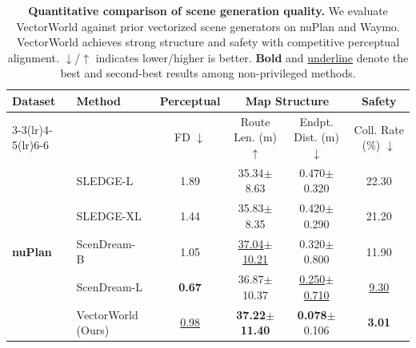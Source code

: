 \documentclass{article}
\newcommand{\best}[1]{\textbf{#1}}
\newcommand{\secbest}[1]{\underline{#1}}
\theoremstyle{plain}
\theoremstyle{definition}
\theoremstyle{remark}
\begin{document}
\begin{table}[t]
\centering
\begin{threeparttable}
\caption{\textbf{Quantitative comparison of scene generation quality.}
We evaluate VectorWorld against prior vectorized scene generators on nuPlan and Waymo. VectorWorld achieves strong structure and safety with competitive perceptual alignment.
\(\downarrow\)/\(\uparrow\) indicates lower/higher is better.
\textbf{Bold} and \underline{underline} denote the best and second-best results among non-privileged methods.}
\label{tab:main_performance}
\renewcommand{\arraystretch}{0.9} %
\setlength{\tabcolsep}{1pt} %
\begin{tabular}{@{}llcccc@{}}
\toprule
\multirow{2.5}{*}{\textbf{Dataset}} & \multirow{2.5}{*}{\textbf{Method}} & \textbf{Perceptual} & \multicolumn{2}{c}{\textbf{Map Structure}} & \textbf{Safety} \\
\cmidrule(lr){3-3}\cmidrule(lr){4-5}\cmidrule(lr){6-6}
 & & FD $\downarrow$ & Route Len. (m) $\uparrow$ & Endpt. Dist. (m) $\downarrow$ & Coll. Rate (\%) $\downarrow$ \\
\midrule

\multirow{5}{*}{\textbf{nuPlan}} 
& SLEDGE-L~\cite{chitta2024sledge} & 1.89 & 35.34{\scriptsize $\pm$8.63} & 0.470{\scriptsize $\pm$0.320} & 22.30 \\
& SLEDGE-XL~\cite{chitta2024sledge} & 1.44 & 35.83{\scriptsize $\pm$8.35} & 0.420{\scriptsize $\pm$0.290} & 21.20 \\
& ScenDream-B~\cite{rowe2025scenario} & 1.05 & \secbest{37.04{\scriptsize $\pm$10.21}} & 0.320{\scriptsize $\pm$0.800} & 11.90 \\
& ScenDream-L~\cite{rowe2025scenario} & \best{0.67} & 36.87{\scriptsize $\pm$10.37} & \secbest{0.250{\scriptsize $\pm$0.710}} & \secbest{9.30} \\
& \cellcolor{oursrow}VectorWorld (Ours) & \cellcolor{oursrow}\secbest{0.98} & \cellcolor{oursrow}\best{37.22{\scriptsize $\pm$11.40}} & \cellcolor{oursrow}\best{0.078}{\scriptsize $\pm$0.106} & \cellcolor{oursrow}\best{3.01} \\
\midrule


\end{tabular}
\end{threeparttable}
\end{table}
\end{document}
